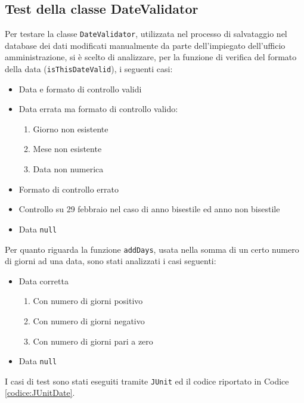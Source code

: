 \subsection{Test della classe DateValidator}
Per testare la classe \verb|DateValidator|, utilizzata nel processo di salvataggio nel database dei dati modificati manualmente da parte dell'impiegato dell'ufficio amministrazione, si è scelto di analizzare, per la funzione di verifica del formato della data (\verb|isThisDateValid|), i seguenti casi:
\begin{itemize}
	\item Data e formato di controllo validi
	\item Data errata ma formato di controllo valido:
		\begin{enumerate}
			\item Giorno non esistente
			\item Mese non esistente
			\item Data non numerica
		\end{enumerate}
	\item Formato di controllo errato
	\item Controllo su 29 febbraio nel caso di anno bisestile ed anno non bisestile
	\item Data \verb|null|
\end{itemize}
Per quanto riguarda la funzione \verb|addDays|, usata nella somma di un certo numero di giorni ad una data, sono stati analizzati i casi seguenti:
\begin{itemize}
	\item Data corretta
		\begin{enumerate}
			\item Con numero di giorni positivo
			\item Con numero di giorni negativo
			\item Con numero di giorni pari a zero
		\end{enumerate}
	\item Data \verb|null|
\end{itemize}
I casi di test sono stati eseguiti tramite \verb|JUnit| ed il codice riportato in Codice \ref{codice:JUnitDate}.

